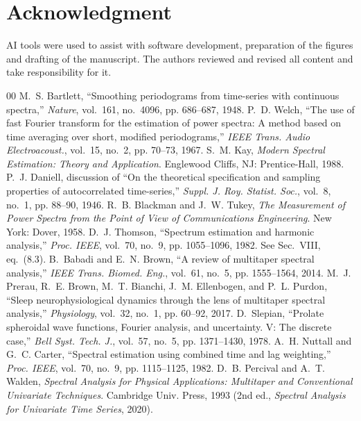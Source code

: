 \documentclass[10pt,twocolumn]{article}
\begin{document}
\section*{Acknowledgment}
AI tools were used to assist with software development, preparation of the figures and drafting of the manuscript. The authors reviewed and revised all content and take responsibility for it.

\begin{thebibliography}{00}
 M.~S. Bartlett, ``Smoothing periodograms from time-series with continuous spectra,'' \emph{Nature}, vol.~161, no.~4096, pp. 686--687, 1948.
 P.~D. Welch, ``The use of fast Fourier transform for the estimation of power spectra: A method based on time averaging over short, modified periodograms,'' \emph{IEEE Trans. Audio Electroacoust.}, vol.~15, no.~2, pp. 70--73, 1967.
 S.~M. Kay, \emph{Modern Spectral Estimation: Theory and Application}. Englewood Cliffs, NJ: Prentice-Hall, 1988.
 P.~J. Daniell, discussion of ``On the theoretical specification and sampling properties of autocorrelated time-series,'' \emph{Suppl. J. Roy. Statist. Soc.}, vol.~8, no.~1, pp. 88--90, 1946.
 R.~B. Blackman and J.~W. Tukey, \emph{The Measurement of Power Spectra from the Point of View of Communications Engineering}. New York: Dover, 1958.
 D.~J. Thomson, ``Spectrum estimation and harmonic analysis,'' \emph{Proc. IEEE}, vol.~70, no.~9, pp. 1055--1096, 1982. See Sec.~VIII, eq.~(8.3).
 B.~Babadi and E.~N. Brown, ``A review of multitaper spectral analysis,'' \emph{IEEE Trans. Biomed. Eng.}, vol.~61, no.~5, pp. 1555--1564, 2014.
 M.~J. Prerau, R.~E. Brown, M.~T. Bianchi, J.~M. Ellenbogen, and P.~L. Purdon, ``Sleep neurophysiological dynamics through the lens of multitaper spectral analysis,'' \emph{Physiology}, vol.~32, no.~1, pp. 60--92, 2017.
 D.~Slepian, ``Prolate spheroidal wave functions, Fourier analysis, and uncertainty. V: The discrete case,'' \emph{Bell Syst. Tech. J.}, vol.~57, no.~5, pp. 1371--1430, 1978.
 A.~H. Nuttall and G.~C. Carter, ``Spectral estimation using combined time and lag weighting,'' \emph{Proc. IEEE}, vol.~70, no.~9, pp. 1115--1125, 1982.
 D.~B. Percival and A.~T. Walden, \emph{Spectral Analysis for Physical Applications: Multitaper and Conventional Univariate Techniques}. Cambridge Univ. Press, 1993 (2nd ed., \emph{Spectral Analysis for Univariate Time Series}, 2020).

\end{thebibliography}
\end{document}
